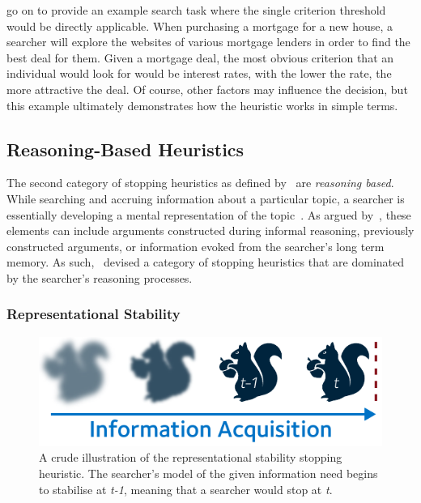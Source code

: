 \cite{browne2005stopping_rules} go on to provide an example search task where the single criterion threshold would be directly applicable. When purchasing a mortgage for a new house, a searcher will explore the websites of various mortgage lenders in order to find the best deal for them. Given a mortgage deal, the most obvious criterion that an individual would look for would be interest rates, with the lower the rate, the more attractive the deal. Of course, other factors may influence the decision, but this example ultimately demonstrates how the heuristic works in simple terms.

\subsection{Reasoning-Based Heuristics}\label{sec:stopping_background:heuristics:reasoning}
The second category of stopping heuristics as defined by~\cite{nickles1995judgment} are \emph{reasoning based}. While searching and accruing information about a particular topic, a searcher is essentially developing a mental representation of the topic~\citep{yates1990decision_making}. As argued by~\cite{nickles1995judgment}, these elements can include arguments constructed during informal reasoning, previously constructed arguments, or information evoked from the searcher's long term memory. As such,~\cite{nickles1995judgment} devised a category of stopping heuristics that are dominated by the searcher's reasoning processes.

\subsubsection{Representational Stability}\label{sec:stopping_background:heuristics:representational}
\begin{figure}
    \begin{center}
    \vspace*{-11mm}
    \includegraphics[width=1\textwidth]{figures/ch3-representational.pdf}
    \end{center}
    \vspace*{-5mm}
    \caption[Representational stability stopping heuristic]{A crude illustration of the representational stability stopping heuristic. The searcher's model of the given information need begins to stabilise at \emph{t-1}, meaning that a searcher would stop at \emph{t}.}
    \label{fig:representational_heuristic}
\end{figure}

